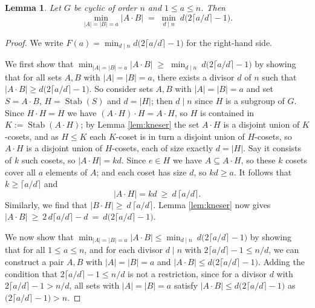 \documentclass{article}
\newtheorem{lemma}{Lemma}
\newcommand{\Stab}{\operatorname{Stab}}
\begin{document}
\begin{lemma}\label{lem:minprod}
Let $G$ be cyclic of order $n$ and $1\le a\le n$. Then
\[
  \min_{|A|=|B|=a}|A\cdot B|
  \;=\;\min_{d\mid n}\ d\bigl(2\lceil a/d\rceil-1\bigr).
\]
\end{lemma}

\begin{proof}
We write $F(a)=\min_{d\mid n}d\bigl(2\lceil a/d\rceil-1\bigr)$ for the right-hand
side. 

We first show that $\min_{|A|=|B|=a}|A\cdot B|
  \;\geq\;\min_{d\mid n}\ d\bigl(2\lceil a/d\rceil-1\bigr)$ by showing that for all sets $A,B$ with $|A|=|B|=a$, there exists a divisor $d$ of $n$ such that  $|A\cdot B|\ge d\bigl(2\lceil a/d\rceil-1\bigr)$.
So consider sets $A,B$ with $|A|=|B|=a$ and set $S=A\cdot B$, $H=\Stab(S)$ and $d=|H|$; then $d\mid n$ since $H$ is a subgroup of $G$. 
Since $H\cdot H=H$ we have $(A\cdot H)\cdot H=A\cdot H$, so $H$ is contained in
$K:=\Stab(A\cdot H)$; by Lemma \ref{lem:kneser} the set $A\cdot H$ is a disjoint
union of $K$-cosets, and as $H\le K$ each $K$-coset is in turn a disjoint union of
$H$-cosets, so $A\cdot H$ is a disjoint union of $H$-cosets, each of size exactly $d=|H|$. Say it consists of $k$ such cosets, so $|A\cdot H|=kd$. Since $e\in H$
we have $A\subseteq A\cdot H$, so these $k$ cosets cover all $a$ elements of $A$;
and each coset has size $d$, so $kd\ge a$. It follows that $k\ge\lceil a/d\rceil$ and
\[
  |A\cdot H|=kd\ \ge\ d\,\lceil a/d\rceil .
\]
Similarly, we find that $|B\cdot H|\ge\ d\,\lceil a/d\rceil$. Lemma \ref{lem:kneser} now gives $  |A\cdot B|\ \ge\ 2\,d\lceil a/d\rceil-d\ =\ d\bigl(2\lceil a/d\rceil-1\bigr).$


We now show that $\min_{|A|=|B|=a}|A\cdot B|
\leq\min_{d\mid n}\ d\bigl(2\lceil a/d\rceil-1\bigr)$ by showing that for all $1\leq a\leq n$, and for each divisor $d\mid n$ with $2\lceil a/d\rceil-1\le
n/d$, we can construct a pair $A,B$ with $|A|=|B|=a$ and $|A\cdot B|\le d\bigl(2\lceil a/d\rceil-1\bigr)$. Adding the condition that $2\lceil a/d\rceil-1\le
n/d$ is not a restriction, since for a divisor $d$ with $2\lceil a/d\rceil-1>
n/d$, all sets with $|A|=|B|=a$ satisfy $|A\cdot B|\leq d\bigl(2\lceil a/d\rceil-1\bigr)$ as $\bigl(2\lceil a/d\rceil-1\bigr)>n$.


\end{proof}
\end{document}
